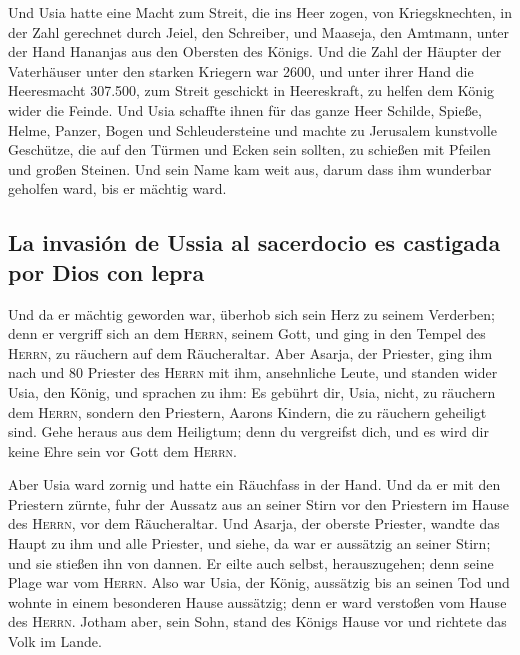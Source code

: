  Und Usia hatte eine Macht zum Streit, die ins Heer
zogen, von Kriegsknechten, in der Zahl gerechnet durch Jeiel, den
Schreiber, und Maaseja, den Amtmann, unter der Hand Hananjas aus den
Obersten des Königs.  Und die Zahl der Häupter der
Vaterhäuser unter den starken Kriegern war 2600,  und
unter ihrer Hand die Heeresmacht 307.500, zum Streit geschickt in
Heereskraft, zu helfen dem König wider die Feinde.  Und
Usia schaffte ihnen für das ganze Heer Schilde, Spieße, Helme, Panzer,
Bogen und Schleudersteine  und machte zu Jerusalem
kunstvolle Geschütze, die auf den Türmen und Ecken sein sollten, zu
schießen mit Pfeilen und großen Steinen. Und sein Name kam weit aus,
darum dass ihm wunderbar geholfen ward, bis er mächtig ward.

\hypertarget{la-invasiuxf3n-de-ussia-al-sacerdocio-es-castigada-por-dios-con-lepra}{%
\subsection{La invasión de Ussia al sacerdocio es castigada por Dios con
lepra}\label{la-invasiuxf3n-de-ussia-al-sacerdocio-es-castigada-por-dios-con-lepra}}

 Und da er mächtig geworden war, überhob sich sein Herz
zu seinem Verderben; denn er vergriff sich an dem \textsc{Herrn}, seinem
Gott, und ging in den Tempel des \textsc{Herrn}, zu räuchern auf dem
Räucheraltar.  Aber Asarja, der Priester, ging ihm nach
und 80 Priester des \textsc{Herrn} mit ihm, ansehnliche Leute,
 und standen wider Usia, den König, und sprachen zu ihm:
Es gebührt dir, Usia, nicht, zu räuchern dem \textsc{Herrn}, sondern den
Priestern, Aarons Kindern, die zu räuchern geheiligt sind. Gehe heraus
aus dem Heiligtum; denn du vergreifst dich, und es wird dir keine Ehre
sein vor Gott dem \textsc{Herrn}.

 Aber Usia ward zornig und hatte ein Räuchfass in der
Hand. Und da er mit den Priestern zürnte, fuhr der Aussatz aus an seiner
Stirn vor den Priestern im Hause des \textsc{Herrn}, vor dem
Räucheraltar.  Und Asarja, der oberste Priester, wandte
das Haupt zu ihm und alle Priester, und siehe, da war er aussätzig an
seiner Stirn; und sie stießen ihn von dannen. Er eilte auch selbst,
herauszugehen; denn seine Plage war vom \textsc{Herrn}. 
Also war Usia, der König, aussätzig bis an seinen Tod und wohnte in
einem besonderen Hause aussätzig; denn er ward verstoßen vom Hause des
\textsc{Herrn}. Jotham aber, sein Sohn, stand des Königs Hause vor und
richtete das Volk im Lande.

